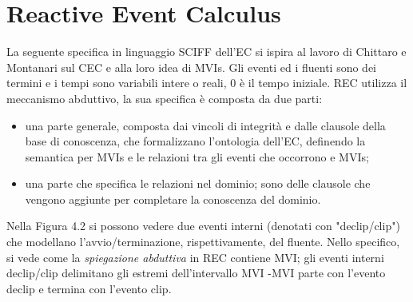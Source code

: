 \documentclass[a4paper,12pt]{report}
\begin{document}
\section{Reactive Event Calculus}
La seguente specifica in linguaggio SCIFF dell'EC si ispira al lavoro di Chittaro e Montanari sul CEC e alla loro idea di MVIs. Gli eventi ed i fluenti sono dei termini e i tempi sono variabili intere o reali, 0 è il tempo iniziale. REC utilizza il meccanismo abduttivo, la sua specifica è composta da due parti:
\begin{itemize}
\item una parte generale, composta dai vincoli di integrità e dalle clausole della base di conoscenza, che formalizzano l'ontologia dell'EC, definendo la semantica per MVIs e le relazioni tra gli eventi che occorrono e MVIs;
\item una parte che specifica le relazioni nel dominio; sono delle clausole che vengono aggiunte per completare la conoscenza del dominio.
\end{itemize}
Nella Figura 4.2 si possono vedere due eventi interni (denotati con "declip/clip") che modellano l'avvio/terminazione, rispettivamente, del fluente.
Nello specifico, si vede come la \textit{spiegazione abduttiva} in REC contiene MVI; gli eventi interni declip/clip delimitano gli estremi dell'intervallo MVI -MVI parte con l'evento declip e termina con l'evento clip.
\end{document}
